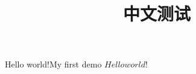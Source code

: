 \documentclass[12pt]{article}
\title{中文测试}
\begin{document}
  
Hello world!My first demo
$Hello world!$ %
\end{document}
